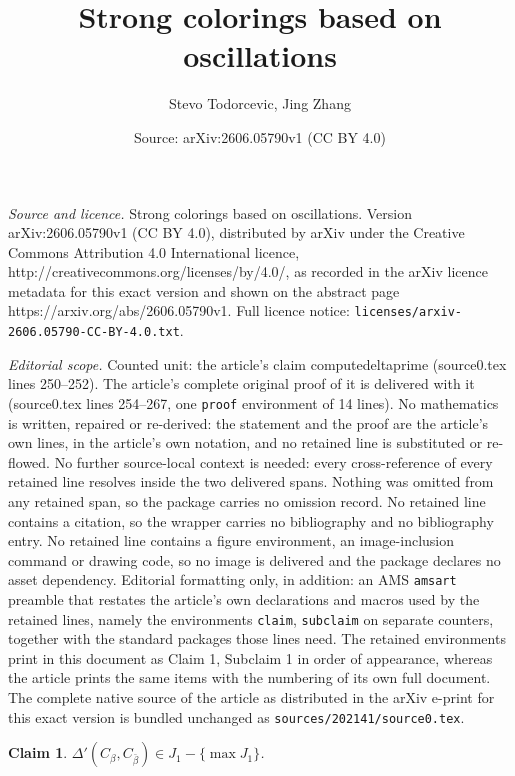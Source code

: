 \documentclass[10pt,a4paper]{amsart}
\title{Strong colorings based on oscillations}
\author{Stevo Todorcevic, Jing Zhang}
\date{Source: arXiv:2606.05790v1 (CC BY 4.0)}
\newtheorem{claim}{Claim}
\begin{document}
\maketitle

\noindent\emph{Source and licence.} Strong colorings based on oscillations. Version arXiv:2606.05790v1 (CC BY 4.0), distributed by arXiv under the Creative Commons Attribution 4.0 International licence, http://creativecommons.org/licenses/by/4.0/, as recorded in the arXiv licence metadata for this exact version and shown on the abstract page https://arxiv.org/abs/2606.05790v1. Full licence notice: \texttt{licenses/arxiv-2606.05790-CC-BY-4.0.txt}.\par\smallskip

\noindent\textit{Editorial scope.} Counted unit: the article's claim computedeltaprime (source0.tex lines 250--252). The article's complete original proof of it is delivered with it (source0.tex lines 254--267, one \texttt{proof} environment of 14 lines). No mathematics is written, repaired or re-derived: the statement and the proof are the article's own lines, in the article's own notation, and no retained line is substituted or re-flowed.  No further source-local context is needed: every cross-reference of every retained line resolves inside the two delivered spans.  Nothing was omitted from any retained span, so the package carries no omission record.  No retained line contains a citation, so the wrapper carries no bibliography and no bibliography entry.  No retained line contains a figure environment, an image-inclusion command or drawing code, so no image is delivered and the package declares no asset dependency.  Editorial formatting only, in addition: an AMS \texttt{amsart} preamble that restates the article's own declarations and macros used by the retained lines, namely the environments \texttt{claim}, \texttt{subclaim} on separate counters, together with the standard packages those lines need.  The retained environments print in this document as Claim 1, Subclaim 1 in order of appearance, whereas the article prints the same items with the numbering of its own full document.  The complete native source of the article as distributed in the arXiv e-print for this exact version is bundled unchanged as \texttt{sources/202141/source0.tex}.
	\begin{claim}\label{claim: computedeltaprime}
	$\Delta'(C_{\beta}, C_{\bar{\beta}})\in J_1-\{\max J_1\}$.
	\end{claim}
\end{document}
